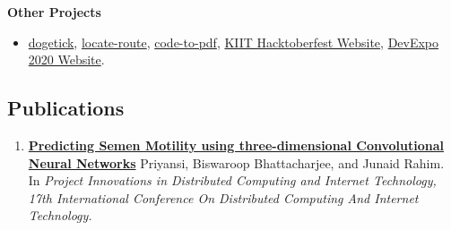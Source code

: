 \documentclass[11pt,a4paper,calibri]{moderncv}        %
\begin{document}
	\begin{itemize}[leftmargin=0.0in]
		\setlength\itemsep{.2em}

	
	
		\textbf{Other Projects}
		\vspace{-5pt}
		\begin{itemize}
			\item \href{https://github.com/junaidrahim/dogetick}{dogetick}, 
				  \href{https://github.com/junaidrahim/locate-route}{locate-route}, \href{https://github.com/junaidrahim/code-to-pdf}{code-to-pdf}, 	\href{https://kiithacktoberfest.netlify.app/}{KIIT Hacktoberfest Website}, 
				  \href{https://devexpo2020.firebaseapp.com/}{DevExpo 2020 Website}.
		\end{itemize}
	\end{itemize}

	\vspace{-7pt}
	\subsection{Publications}
	
	\begin{enumerate}
		
		\item \href{https://arxiv.org/abs/2101.02888}{\textbf{Predicting Semen Motility using three-dimensional
				Convolutional Neural Networks}} Priyansi, Biswaroop Bhattacharjee, and Junaid Rahim. In \textit{Project Innovations in Distributed Computing and Internet Technology, 17th International Conference On Distributed Computing And Internet Technology.
		}
	\end{enumerate}
\end{document}
